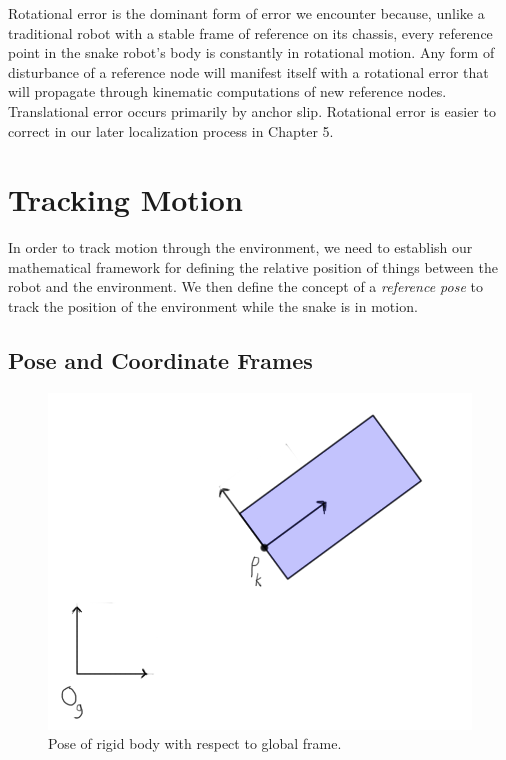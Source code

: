 Rotational error is the dominant form of error we encounter because, unlike a traditional robot with a stable frame of reference on its chassis, every reference point in the snake robot's body is constantly in rotational motion. Any form of disturbance of a reference node will manifest itself with a rotational error that will propagate through kinematic computations of new reference nodes. Translational error occurs primarily by anchor slip.  Rotational error is easier to correct in our later localization process in Chapter 5.

\section{Tracking Motion}


In order to track motion through the environment, we need to establish our mathematical framework for defining the relative position of things between the robot and the environment.  We then define the concept of a \emph{reference pose} to track the position of the environment while the snake is in motion.

\subsection{Pose and Coordinate Frames}

\begin{figure}
\begin{center}
\includegraphics[scale=0.5]{3_pose_frame1.png}
\end{center}
\caption{Pose of rigid body with respect to global frame.}
\label{fig:pose_frame1}
\end{figure}

